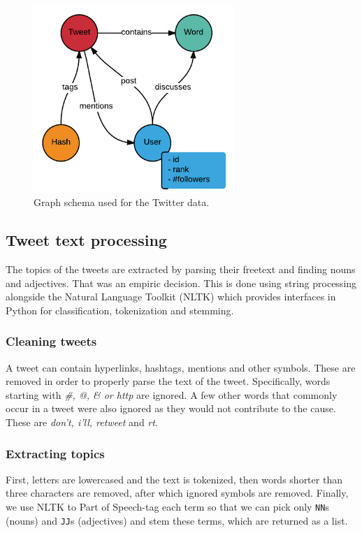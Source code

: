 \begin{figure}[t]
\centering
\includegraphics[width=3.0in,natwidth=440,natheight=409]{images/Schema.png}
\caption{Graph schema used for the Twitter data.}
\label{fig:schema}
\end{figure}

\subsection{Tweet text processing}

The topics of the tweets are extracted by parsing their freetext and
finding nouns and adjectives. That was an empiric decision. This is done 
using string processing alongside the Natural Language Toolkit (NLTK) 
\cite{bird2006nltk} which provides interfaces in Python for classification, 
tokenization and stemming.

\subsubsection{Cleaning tweets}

A tweet can contain hyperlinks, hashtags, mentions and other symbols. These are
removed in order to properly parse the text of the tweet. Specifically, words
starting with \textit{\#, @, \& or http} are ignored. A few other words that
commonly occur in a tweet were also ignored as they would not contribute to the
cause. These are \textit{don't, i'll, retweet} and \textit{rt}.

\subsubsection{Extracting topics}

First, letters are lowercased and the text is tokenized, then words shorter than
three characters are removed, after which ignored symbols are removed. Finally,
we use NLTK to Part of Speech-tag \cite{pos} each term so that we can pick only
\texttt{NN}s (nouns) and \texttt{JJ}s (adjectives) and stem these terms, which are
returned as a list.

